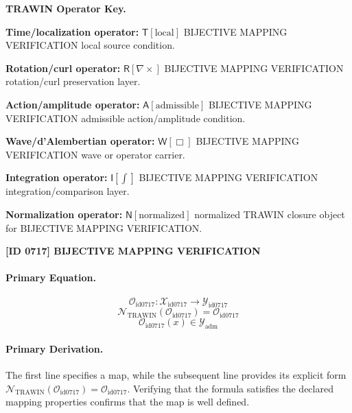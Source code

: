 \par\vspace{0.45\baselineskip}
\noindent\begin{minipage}[t]{\linewidth}
\begingroup
\small
\raggedright
\textbf{TRAWIN Operator Key.}\par
\noindent\textbf{Time/localization operator:} $\mathsf{T}\!\left[\mathrm{local}\right]$ BIJECTIVE MAPPING VERIFICATION local source condition.\par
\noindent\textbf{Rotation/curl operator:} $\mathsf{R}\!\left[\nabla\times\right]$ BIJECTIVE MAPPING VERIFICATION rotation/curl preservation layer.\par
\noindent\textbf{Action/amplitude operator:} $\mathsf{A}\!\left[\mathrm{admissible}\right]$ BIJECTIVE MAPPING VERIFICATION admissible action/amplitude condition.\par
\noindent\textbf{Wave/d'Alembertian operator:} $\mathsf{W}\!\left[\Box\right]$ BIJECTIVE MAPPING VERIFICATION wave or operator carrier.\par
\noindent\textbf{Integration operator:} $\mathsf{I}\!\left[\int\right]$ BIJECTIVE MAPPING VERIFICATION integration/comparison layer.\par
\noindent\textbf{Normalization operator:} $\mathsf{N}\!\left[\mathrm{normalized}\right]$ normalized TRAWIN closure object for BIJECTIVE MAPPING VERIFICATION.\par
\endgroup
\end{minipage}

\clearpage
\noindent\textbf{[ID 0717] BIJECTIVE MAPPING VERIFICATION}\par
\vspace{0.35em}
\paragraph{Primary Equation.}
\[
\mathcal{O}_{\mathrm{id0717}}:\mathcal{X}_{\mathrm{id0717}}\longrightarrow\mathcal{Y}_{\mathrm{id0717}}
\]
\[
\mathcal{N}_{\mathrm{TRAWIN}}(\mathcal{O}_{\mathrm{id0717}})=\mathcal{O}_{\mathrm{id0717}}
\]
\[
\mathcal{O}_{\mathrm{id0717}}(x)\in\mathcal{Y}_{\mathrm{adm}}
\]

\paragraph{Primary Derivation.}
The first line specifies a map, while the subsequent line provides its explicit form \( \mathcal{N}_{\mathrm{TRAWIN}}(\mathcal{O}_{\mathrm{id0717}})=\mathcal{O}_{\mathrm{id0717}} \). Verifying that the formula satisfies the declared mapping properties confirms that the map is well defined.
